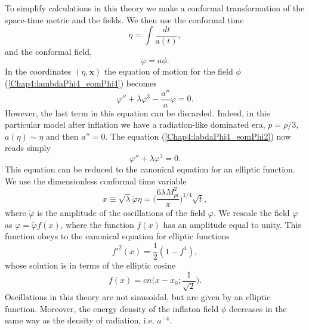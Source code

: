 \documentclass[11pt,a4paper,twoside]{book}
\begin{document}
 To simplify calculations in this theory we make a conformal transformation of the space-time metric and the fields. We then use the conformal time
 \begin{equation}
\label{Chap4:ConformalTime}
\eta = \int \frac{dt}{a(t)},
 \end{equation}
 and the conformal field,
 \begin{equation}
 	\label{Chap4:lambdaPhi4_ConformalField}
\varphi = a\phi.
 \end{equation}
 In the coordinates $ (\eta,\textbf{x}) $ the equation of motion for the field $\phi$ (\ref{Chap4:lambdaPhi4_eomPhi4}) becomes 
 \begin{equation}
\label{Chap4:labdaPhi4_eomPhi2}
\varphi'' + \lambda\varphi^{3} - \frac{a''}{a}\varphi=0.
 \end{equation}
 However, the last term in this equation can be discarded. Indeed, in this particular model after inflation we have a radiation-like dominated era, $ p=\rho/3 $,  $ a(\eta) \sim \eta $ and then $ a''= 0 $. The equation (\ref{Chap4:labdaPhi4_eomPhi2}) now reads simply
 \begin{equation}
 	\label{Chap4:labdaPhi4_eomPhi3}
 	\varphi'' + \lambda\varphi^{3}=0.
 \end{equation}
 This equation can be reduced to the canonical equation for an elliptic function. We use the dimensionless conformal time variable
 \begin{equation}
\label{Chap4:lambdaPhi4_conformalTimeVariable}
x\equiv \sqrt{\lambda} \tilde{\varphi}\eta = \Bigg( \frac{6\lambda M_{pl}^{2}}{\pi}\Bigg)^{1/4}\sqrt{t},
 \end{equation}
 where $\tilde{\varphi}$ is the amplitude of the oscillations of the field $\varphi$. We rescale the field $\varphi$ as $\varphi=\tilde{\varphi}f(x)$, where the function $ f(x) $ has an amplitude equal to unity. This function  obeys to the canonical equation for elliptic functions
 \begin{equation}
 	\label{chap4:lambdaPhi4_EllipticFunction}
 	f'^{2}(x)=\frac{1}{2}(1-f^{4}),
 \end{equation}
 whose solution is in terms of the elliptic cosine
 \begin{equation}
\label{Chap4:lambdaPhi4_solutionF(x)}
	f(x)=cn\Bigg(x-x_{0};\frac{1}{\sqrt{2}}\Bigg).
 \end{equation}
 Oscillations in this theory are not sinusoidal, but are given by an elliptic function. Moreover, the energy density of the inflaton field $\phi$ decreases in the same way as the density of radiation, i.e. $ a^{-4} $.
 
\end{document}
